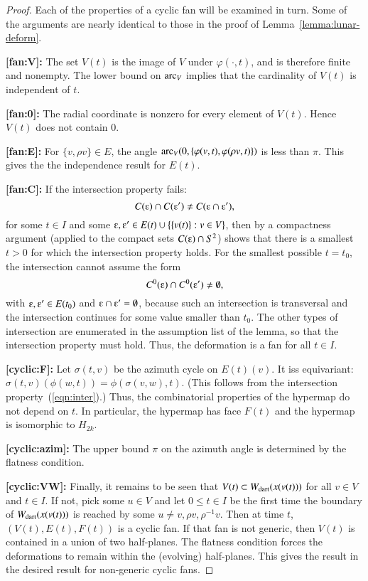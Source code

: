 \begin{proof}
Each of the properties of a cyclic fan will be examined in turn.  Some of the arguments are nearly identical to those in the proof of Lemma~\ref{lemma:lunar-deform}.

{\bf [fan:V]:} The set $V(t)$ is the image of $V$ under $\varphi(\cdot,t)$, and is therefore finite and nonempty. The lower bound on ${\operatorname{arc}}_V$ implies that the cardinality of $V(t)$ is independent of $t$.

{\bf [fan:0]:} The radial coordinate is nonzero for every element of $V(t)$.  Hence $V(t)$ does not contain $0$.

{\bf [fan:E]:} For $\{v,\rho v\}\in E$, the angle 
${\operatorname{arc}}_V(0,\{\varphi(v,t),\varphi(\rho v,t)\})$ is less than $\pi$.
This gives the
the independence result for $E(t)$.

{\bf [fan:C]:} If the intersection property fails:
$$
C(\e) \cap C(\e') \ne C(\e \cap \e'),
$$
for some $t\in I$ and some $\e,\e'\in E(t)\cup \{\{v(t)\}: v\in V\}$,
then by a compactness argument (applied to the compact sets $C(\e)\cap S^2$)
shows that there is a smallest $t>0$ for which the intersection property
holds.  For the smallest possible $t=t_0$, the intersection cannot assume
the form
\begin{equation}\label{eqn:inter}
C^0(\e) \cap C^0(\e') \ne \emptyset,
\end{equation}
with $\e,\e'\in E(t_0)$ and $\e\cap \e'=\emptyset$, because such an intersection is transversal and the intersection continues for some value smaller than $t_0$.  The other types of intersection are enumerated in the assumption list of the lemma, so that the intersection property must hold.  Thus, the deformation is a fan for all $t\in I$.

{\bf [cyclic:F]:} Let $\sigma(t,v)$ be the azimuth cycle on $E(t)(v)$.  It iss equivariant:  $\sigma(t,v) (\phi(w,t)) = \phi(\sigma(v,w),t)$.   (This follows from the intersection property~(\ref{eqn:inter}).)  Thus, the combinatorial properties of the hypermap do not depend on $t$.  In particular, the hypermap has face $F(t)$ and the hypermap is isomorphic to $H_{2k}$.

{\bf [cyclic:azim]:} The upper bound $\pi$ on the azimuth angle is determined by the flatness condition.

{\bf [cyclic:VW]:} Finally, it remains to be seen that $V(t)\subset W_{\text{dart}}(x(v(t)))$ for all $v\in V$ and $t\in I$.  If not, pick some $u\in V$ and let $0\le t\in I$ be the first time the boundary of $W_{\text{dart}}(x(v(t)))$ is reached by some $u\ne v,\rho v,\rho^{-1} v$.  Then at time $t$, $(V(t),E(t),F(t))$ is a cyclic fan.  If that fan is not generic, then $V(t)$ is contained in a union of two half-planes.  The flatness condition forces the deformations to remain within the (evolving) half-planes. This gives the result in the desired result for non-generic cyclic fans.  


\end{proof}

